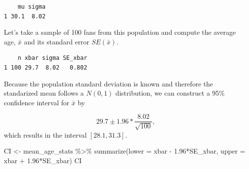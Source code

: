 \documentclass[
  letterpaper,
  DIV=11,
  numbers=noendperiod]{scrreprt}
\newenvironment{Shaded}{\begin{snugshade}}{\end{snugshade}}
\newcommand{\AttributeTok}[1]{\textcolor[rgb]{0.40,0.45,0.13}{#1}}
\newcommand{\DecValTok}[1]{\textcolor[rgb]{0.68,0.00,0.00}{#1}}
\newcommand{\FloatTok}[1]{\textcolor[rgb]{0.68,0.00,0.00}{#1}}
\newcommand{\FunctionTok}[1]{\textcolor[rgb]{0.28,0.35,0.67}{#1}}
\newcommand{\NormalTok}[1]{\textcolor[rgb]{0.00,0.23,0.31}{#1}}
\newcommand{\OtherTok}[1]{\textcolor[rgb]{0.00,0.23,0.31}{#1}}
\newcommand{\SpecialCharTok}[1]{\textcolor[rgb]{0.37,0.37,0.37}{#1}}
\theoremstyle{definition}
\theoremstyle{remark}
\begin{document}
\begin{verbatim}
    mu sigma
1 30.1  8.02
\end{verbatim}

Let's take a sample of 100 fans from this population and compute the
average age, \(\bar{x}\) and its standard error \(SE(\bar{x})\).

\begin{Shaded}
\end{Shaded}

\begin{verbatim}
    n xbar sigma SE_xbar
1 100 29.7  8.02   0.802
\end{verbatim}

Because the population standard deviation is known and therefore the
standarized mean follows a \(N(0,1)\) distribution, we can construct a
95\% confidence interval for \(\bar{x}\) by

\[29.7 \pm 1.96*\frac{8.02}{\sqrt{100}},\] which results in the interval
\([28.1, 31.3]\).

\begin{Shaded}
\begin{Highlighting}[]
\NormalTok{CI }\OtherTok{\textless{}{-}}\NormalTok{ mean\_age\_stats }\SpecialCharTok{\%\textgreater{}\%} 
  \FunctionTok{summarize}\NormalTok{(}\AttributeTok{lower =}\NormalTok{ xbar }\SpecialCharTok{{-}} \FloatTok{1.96}\SpecialCharTok{*}\NormalTok{SE\_xbar,}
            \AttributeTok{upper =}\NormalTok{ xbar }\SpecialCharTok{+} \FloatTok{1.96}\SpecialCharTok{*}\NormalTok{SE\_xbar)}
\NormalTok{CI}
\end{Highlighting}
\end{Shaded}
\end{document}
